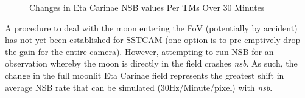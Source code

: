 \begin{figure}[ht]
\begin{minipage}{\linewidth}\centering
{}
\caption{Changes in Eta Carinae NSB values Per TMs Over 30 Minutes}
\label{fig:30minsetacarTM}
\end{minipage}
\end{figure} 
A procedure to deal with the moon entering the FoV (potentially by accident) has not yet been established for SSTCAM (one option is to pre-emptively drop the gain for the entire camera). However, attempting to run NSB for an observation whereby the moon is directly in the field crashes \textit{nsb}. As such, the change in the full moonlit Eta Carinae field represents the greatest shift in average NSB rate that can be simulated (30Hz/Minute/pixel) with \textit{nsb}.

